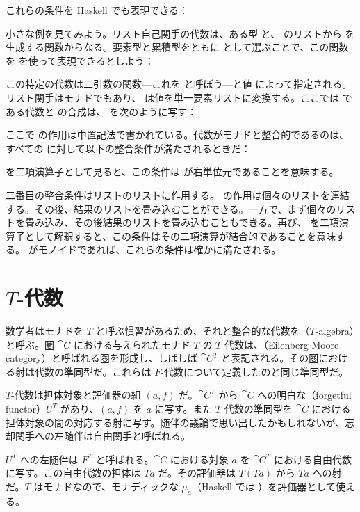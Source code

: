 \noindent
これらの条件を Haskell でも表現できる：

小さな例を見てみよう。リスト自己関手の代数は、ある型  と、 のリストから  を生成する関数からなる。要素型と累積型をともに  として選ぶことで、この関数を  を使って表現できるとしよう：

この特定の代数は二引数の関数—これを  と呼ぼう—と値  によって指定される。リスト関手はモナドでもあり、 は値を単一要素リストに変換する。ここでは  である代数と  の合成は、 を次のように写す：

ここで  の作用は中置記法で書かれている。代数がモナドと整合的であるのは、すべての  に対して以下の整合条件が満たされるときだ：

 を二項演算子として見ると、この条件は  が右単位元であることを意味する。

二番目の整合条件はリストのリストに作用する。 の作用は個々のリストを連結する。その後、結果のリストを畳み込むことができる。一方で、まず個々のリストを畳み込み、その後結果のリストを畳み込むこともできる。再び、 を二項演算子として解釈すると、この条件はその二項演算が結合的であることを意味する。 がモノイドであれば、これらの条件は確かに満たされる。

\section{$T$-代数}

数学者はモナドを $T$ と呼ぶ慣習があるため、それと整合的な代数を（$T$-algebra）と呼ぶ。圏 $\cat{C}$ における与えられたモナド $T$ の $T$-代数は、（Eilenberg-Moore category）と呼ばれる圏を形成し、しばしば $\cat{C}^T$ と表記される。その圏における射は代数の準同型だ。これらは $F$-代数について定義したのと同じ準同型だ。

$T$-代数は担体対象と評価器の組 $(a, f)$ だ。$\cat{C}^T$ から $\cat{C}$ への明白な（forgetful functor）$U^T$ があり、$(a, f)$ を $a$ に写す。また $T$-代数の準同型を $\cat{C}$ における担体対象の間の対応する射に写す。随伴の議論で思い出したかもしれないが、忘却関手への左随伴は自由関手と呼ばれる。

$U^T$ への左随伴は $F^T$ と呼ばれる。$\cat{C}$ における対象 $a$ を $\cat{C}^T$ における自由代数に写す。この自由代数の担体は $T a$ だ。その評価器は $T (T a)$ から $T a$ への射だ。$T$ はモナドなので、モナディックな $\mu_a$（Haskell では ）を評価器として使える。

